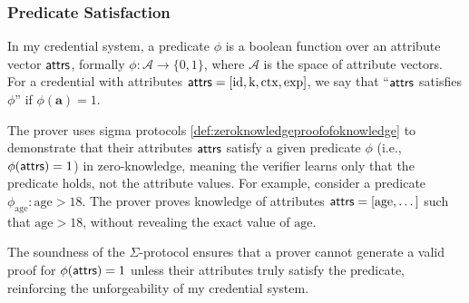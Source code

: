 \subsubsection*{Predicate Satisfaction}

In my credential system, a predicate $\phi$ is a boolean function over an attribute vector $\mathsf{attrs}$, formally $\phi: \mathcal{A} \to \{0,1\}$, where $\mathcal{A}$ is the space of attribute vectors. For a credential with attributes $\mathsf{attrs} = [\text{id}, \text{k}, \text{ctx}, \text{exp}]$, we say that ``$\mathsf{attrs}$ satisfies $\phi$'' if $\phi(\mathbf{a}) = 1$.

The prover uses sigma protocols \ref{def:zeroknowledgeproofofoknowledge} to demonstrate that their attributes $\mathsf{attrs}$ satisfy a given predicate $\phi$ (i.e., $\phi(\mathsf{attrs}) = 1$) in zero-knowledge, meaning the verifier learns only that the predicate holds, not the attribute values. For example, consider a predicate $\phi_{\text{age}}: \text{age} > 18$. The prover proves knowledge of attributes $\mathsf{attrs}= [\text{age}, \dots]$ such that $\text{age} > 18$, without revealing the exact value of $\text{age}$.

The soundness of the $\Sigma$-protocol ensures that a prover cannot generate a valid proof for $\phi(\mathsf{attrs}) = 1$ unless their attributes truly satisfy the predicate, reinforcing the unforgeability of my credential system.



